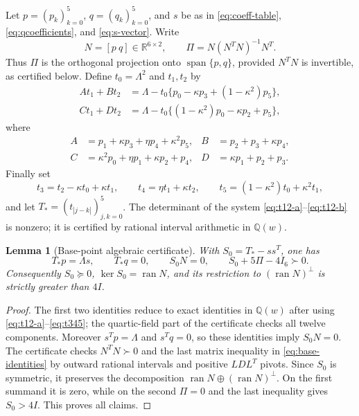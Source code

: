 \documentclass[11pt]{article}
\newtheorem{lemma}[theorem]{Lemma}
\newcommand{\R}{\mathbb R}
\newcommand{\Q}{\mathbb Q}
\newcommand{\ran}{\operatorname{ran}}
\begin{document}
Let $p=(p_k)_{k=0}^5$, $q=(q_k)_{k=0}^5$, and $s$ be as in \eqref{eq:coeff-table}, \eqref{eq:qcoefficients}, and \eqref{eq:s-vector}. Write
\begin{equation}\label{eq:proj}
 N=[p\ q]\in\R^{6\times2},\qquad
 \Pi=N(N^TN)^{-1}N^T.
\end{equation}
Thus $\Pi$ is the orthogonal projection onto $\operatorname{span}\{p,q\}$, provided $N^TN$ is invertible, as certified below. Define $t_0=\Lambda^2$ and $t_1,t_2$ by
\begin{align}
 At_1+Bt_2&=\Lambda-t_0\{p_0-\kappa p_3+(1-\kappa^2)p_5\},\label{eq:t12-a}\\
 Ct_1+Dt_2&=\Lambda-t_0\{(1-\kappa^2)p_0-\kappa p_2+p_5\},\label{eq:t12-b}
\end{align}
where
\begin{align*}
 A&=p_1+\kappa p_3+\eta p_4+\kappa^2p_5,&B&=p_2+p_3+\kappa p_4,\\
 C&=\kappa^2p_0+\eta p_1+\kappa p_2+p_4,&D&=\kappa p_1+p_2+p_3.
\end{align*}
Finally set
\begin{equation}\label{eq:t345}
 t_3=t_2-\kappa t_0+\kappa t_1,\qquad
 t_4=\eta t_1+\kappa t_2,\qquad
 t_5=(1-\kappa^2)t_0+\kappa^2t_1,
\end{equation}
and let $T_*=(t_{|j-k|})_{j,k=0}^5$. The determinant of the system \eqref{eq:t12-a}--\eqref{eq:t12-b} is nonzero; it is certified by rational interval arithmetic in $\Q(w)$.

\begin{lemma}[Base-point algebraic certificate]\label{lem:base}
With $S_0=T_*-ss^T$, one has
\begin{equation}\label{eq:base-identities}
 T_*p=\Lambda s,\qquad T_*q=0,\qquad
 S_0N=0,\qquad S_0+5\Pi-4I_6\succ0.
\end{equation}
Consequently $S_0\succeq0$, $\ker S_0=\ran N$, and its restriction to $(\ran N)^\perp$ is strictly greater than $4I$.
\end{lemma}
\begin{proof}
The first two identities reduce to exact identities in $\Q(w)$ after using \eqref{eq:t12-a}--\eqref{eq:t345}; the quartic-field part of the certificate checks all twelve components. Moreover $s^Tp=\Lambda$ and $s^Tq=0$, so these identities imply $S_0N=0$. The certificate checks $N^TN\succ0$ and the last matrix inequality in \eqref{eq:base-identities} by outward rational intervals and positive $LDL^T$ pivots. Since $S_0$ is symmetric, it preserves the decomposition $\ran N\oplus(\ran N)^\perp$. On the first summand it is zero, while on the second $\Pi=0$ and the last inequality gives $S_0>4I$. This proves all claims.
\end{proof}
\end{document}

